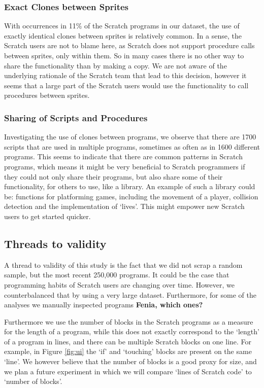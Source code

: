 \documentclass{sig-alternate}
\newcommand{\todo}[1]{\textbf{#1}}
\begin{document}
\subsubsection{Exact Clones between Sprites}
With occurrences in 11\% of the Scratch programs in our dataset, the use of exactly identical clones between sprites is relatively common. In a sense, the Scratch users are not to blame here, as Scratch does not support procedure calls between sprites, only within them. So in many cases there is no other way to share the functionality than by making a copy. We are not aware of the underlying rationale of the Scratch team that lead to this decision, however it seems that a large part of the Scratch users would use the functionality to call procedures between sprites.

\subsubsection{Sharing of Scripts and Procedures}
Investigating the use of clones between programs, we observe that there are 1700 scripts that are used in multiple programs, sometimes as often as in 1600 different programs. This seems to indicate that there are common patterns in Scratch programs, which means it might be very beneficial to Scratch programmers if they could not only share their programs, but also share some of their functionality, for others to use, like a library. An example of such a library could be: functions for platforming games, including the movement of a player, collision detection and the implementation of `lives'. This might empower new Scratch users to get started quicker.





\subsection{Threads to validity}
A thread to validity of this study is the fact that we did not scrap a random sample, but the most recent 250,000 programs. It could be the case that programming habits of Scratch users are changing over time. However, we counterbalanced that by using a very large dataset. Furthermore, for some of the analyses we manually inspected programs \todo{Fenia, which ones?}

Furthermore we use the number of blocks in the Scratch programs as a measure for the length of a program, while this does not exactly correspond to the `length' of a program in lines, and there can be multiple Scratch blocks on one line. For example, in Figure \ref{fig:ui} the `if' and `touching' blocks are present on the same `line'. We however believe that the number of blocks is a good proxy for size, and we plan a future experiment in which we will compare `lines of Scratch code' to `number of blocks'.
\end{document}
